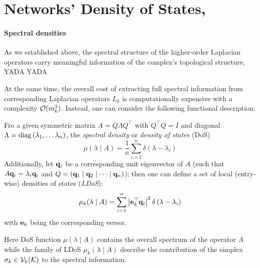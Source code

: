 
%


\section{ Networks' Density of States, \cite{dong2019network} }
%

\paragraph{ Spectral densities }

As we established above, the spectral structure of the higher-order Laplacian operators carry meaningful information of the complex's topological structure, YADA YADA 

At the same time, the overall cost of extracting full spectral information from corresponding Laplacian operators \( L_k \) is computationally expensive with a complexity \( \mathcal{O} ( m_k^3 ) \). Instead, one can consider the following functional description:

\begin{definition}
      Fro a given symmetric matrix \( A = Q \Lambda Q^\top \) with \( Q^\top Q = I \) and diagonal \( \Lambda = \operatorname{diag} \left( \lambda_1, \dots \lambda_{n} \right) \), the \emph{spectral density} or \emph{density of states} (DoS)
      \begin{equation}
            \mu( \lambda \mid A ) = \frac{1}{n} \sum_{i=1}^{n} \delta \left( \lambda - \lambda_i \right)
      \end{equation}
      Additionally, let \( \mathbf{q}_i \) be a corresponding unit eigenvector of \( A \) (such that \( A \mathbf{q}_i = \lambda_i \mathbf{q}_i \) and \( Q = \left( \mathbf{q}_1 \mid \mathbf{q}_2 \mid \dots \mid \mathbf{q}_n \right)\)); then one can define a set of local (entry-wise) densities of states (\emph{LDoS}):
      \begin{equation}
            \mu_k ( \lambda \mid A ) = \sum_{i=1}^{n} \left| \mathbf{e}_k^\top \mathbf{q}_i \right|^2 \delta \left( \lambda - \lambda_i \right)
      \end{equation}
      with \( \mathbf{e}_k \) being the corresponding versor. 
\end{definition}
Here DoS function \( \mu( \lambda \mid A ) \) contains the overall spectrum of the operator \( A \) while the family of LDoS \( \mu_k ( \lambda \mid A )\) describe the contribution of the simplex \( \sigma_k \in \mathcal{V}_{k}(\mathcal{K}) \) to the spectral information.

